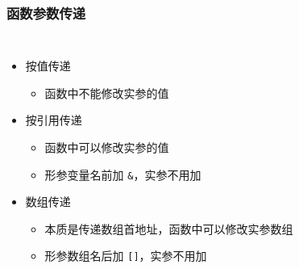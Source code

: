 \begin{frame}[fragile]
    \frametitle{函数参数传递}

    \begin{columns}
    
        \begin{itemize}
            \item<1-> 按值传递
                \begin{itemize}
                    \item 函数中不能修改实参的值
                \end{itemize}
    
            \item<2-> 按引用传递
                \begin{itemize}
                    \item 函数中可以修改实参的值
                    \item 形参变量名前加 \lstinline|&|，实参不用加
                \end{itemize}
    
            \item<3-> 数组传递
                \begin{itemize}
                    \item 本质是传递数组首地址，函数中可以修改实参数组
                    \item 形参数组名后加 \lstinline|[]|，实参不用加
                \end{itemize}
        \end{itemize}

        
    
    \end{columns}

\end{frame}

